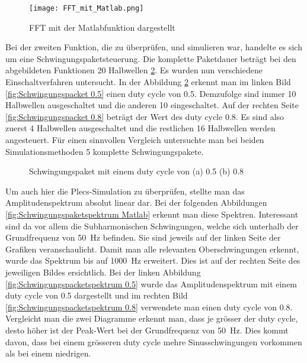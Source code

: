\begin{figure}[ht!]
	\centering
	\texttt{[image: FFT\_mit\_Matlab.png]}	
	\caption{FFT mit der Matlabfunktion dargestellt}
	\label{fig:FFT mit Matlab}
\end{figure}

Bei der zweiten Funktion, die zu überprüfen, und simulieren war, handelte es sich um eine Schwingungspaketsteuerung. Die komplette Paketdauer beträgt bei den abgebildeten Funktionen 20 Halbwellen \ref{fig:Schwingungspaket Matlab}. Es wurden nun verschiedene Einschaltverfahren untersucht. In der Abbildung \ref{fig:Schwingungspaket Matlab} erkennt man im linken Bild \ref{fig:Schwingungspacket 0.5} einen duty cycle von 0.5. Demzufolge sind immer 10 Halbwellen ausgeschaltet und die anderen 10 eingeschaltet.
Auf der rechten Seite \ref{fig:Schwingungspacket 0.8} beträgt der Wert des duty cycle 0.8. Es sind also zuerst 4 Halbwellen ausgeschaltet und die restlichen 16 Halbwellen werden angesteuert. Für einen sinnvollen Vergleich untersuchte man bei beiden Simulationsmethoden 5 komplette Schwingungspakete.

\begin{figure}[ht!]
	\centering
	\qquad
	\caption{Schwingungspaket mit einem duty cycle von (a) 0.5 (b) 0.8}
	\label{fig:Schwingungspaket Matlab}
\end{figure} 

Um auch hier die Plecs-Simulation zu überprüfen, stellte man das Amplitudenspektrum absolut linear dar. Bei der folgenden Abbildungen \ref{fig:Schwingungspaketspektrum Matlab} erkennt man diese Spektren. Interessant sind da vor allem die Subharmonischen Schwingungen, welche sich unterhalb der Grundfrequenz von \SI{50}{Hz} befinden. Sie sind jeweils auf der linken Seite der  Grafiken veranschaulicht. Damit man alle relevanten Oberschwingungen erkennt, wurde das Spektrum bis auf \SI{1000}{Hz} erweitert. Dies ist auf der rechten Seite des jeweiligen Bildes ersichtlich. Bei der linken Abbildung \ref{fig:Schwingungspacketspektrum 0.5} wurde das Amplitudenspektrum mit einem duty cycle von 0.5 dargestellt und im rechten Bild \ref{fig:Schwingungspacketspektrum 0.8} verwendete man einen duty cycle von 0.8. Vergleicht man die zwei Diagramme erkennt man, dass je grösser der duty cycle, desto höher ist der Peak-Wert bei der Grundfrequenz von \SI{50}{Hz}. Dies kommt davon, dass bei einem grösseren duty cycle mehre Sinusschwingungen vorkommen als bei einem niedrigen. 
 

